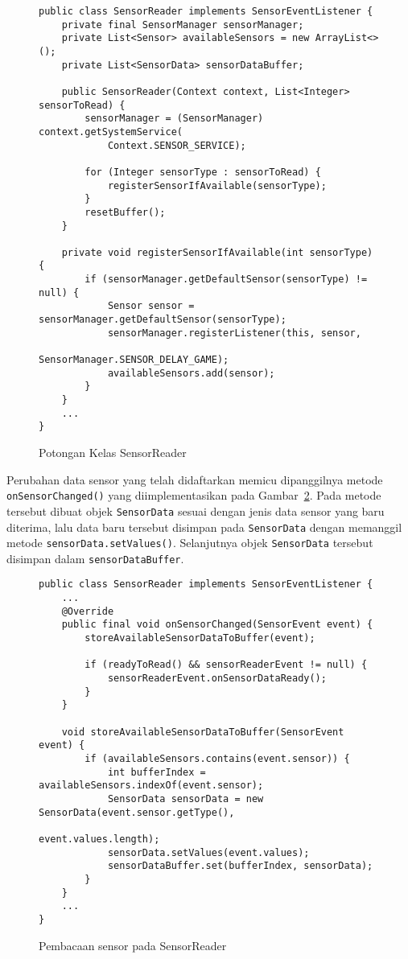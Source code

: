 \begin{figure}[h]
\begin{verbatim}
public class SensorReader implements SensorEventListener {
    private final SensorManager sensorManager;
    private List<Sensor> availableSensors = new ArrayList<>();
    private List<SensorData> sensorDataBuffer;

    public SensorReader(Context context, List<Integer> sensorToRead) {
        sensorManager = (SensorManager) context.getSystemService(
            Context.SENSOR_SERVICE);

        for (Integer sensorType : sensorToRead) {
            registerSensorIfAvailable(sensorType);
        }
        resetBuffer();
    }

    private void registerSensorIfAvailable(int sensorType) {
        if (sensorManager.getDefaultSensor(sensorType) != null) {
            Sensor sensor = sensorManager.getDefaultSensor(sensorType);
            sensorManager.registerListener(this, sensor,
                                           SensorManager.SENSOR_DELAY_GAME);
            availableSensors.add(sensor);
        }
    }
    ...
}
\end{verbatim}
\caption{Potongan Kelas SensorReader}
\label{listing:aktvtas-sensorreader}
\end{figure}

Perubahan data sensor yang telah didaftarkan memicu dipanggilnya metode \texttt{onSensorChanged()} yang diimplementasikan pada Gambar~\ref{listing:aktvtas-pembacaan-sensorreader}. Pada metode tersebut dibuat objek \texttt{SensorData} sesuai dengan jenis data sensor yang baru diterima, lalu data baru tersebut disimpan pada \texttt{SensorData} dengan memanggil metode \texttt{sensorData.setValues()}. Selanjutnya objek \texttt{SensorData} tersebut disimpan dalam \texttt{sensorDataBuffer}.

\begin{figure}[h]
\begin{verbatim}
public class SensorReader implements SensorEventListener {
    ...
    @Override
    public final void onSensorChanged(SensorEvent event) {
        storeAvailableSensorDataToBuffer(event);

        if (readyToRead() && sensorReaderEvent != null) {
            sensorReaderEvent.onSensorDataReady();
        }
    }

    void storeAvailableSensorDataToBuffer(SensorEvent event) {
        if (availableSensors.contains(event.sensor)) {
            int bufferIndex = availableSensors.indexOf(event.sensor);
            SensorData sensorData = new SensorData(event.sensor.getType(),
                                                   event.values.length);
            sensorData.setValues(event.values);
            sensorDataBuffer.set(bufferIndex, sensorData);
        }
    }
    ...
}
\end{verbatim}
\caption{Pembacaan sensor pada SensorReader}
\label{listing:aktvtas-pembacaan-sensorreader}
\end{figure}

